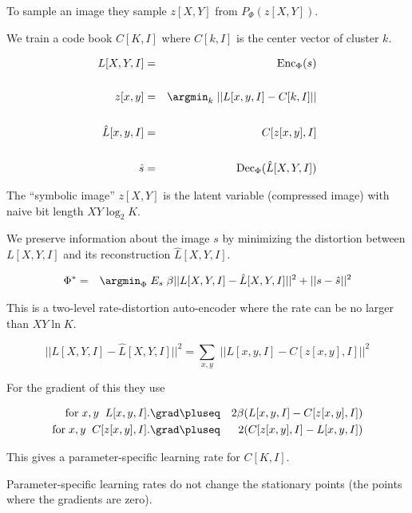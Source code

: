 {\vfill
To sample an image they sample $z[X,Y]$ from $P_\Phi(z[X,Y])$.



We train a code book $C[K,I]$ where $C[k,I]$ is the center vector of cluster $k$.

{\huge
\begin{eqnarray*}
L[X,Y,I] & = & \mathrm{Enc}_\Phi(s) \\
\\
z[x,y] & = & \argmin_k \;||L[x,y,I] - C[k,I]|| \\
\\
\hat{L}[x,y,I] & = & C[z[x,y],I] \\
\\
\hat{s} & = & \mathrm{Dec}_\Phi(\hat{L}[X,Y,I])
\end{eqnarray*}
}

\vfill
The ``symbolic image'' $z[X,Y]$ is the latent variable (compressed image) with naive bit length $XY\log_2 K$.


We preserve information about the image $s$ by minimizing the distortion between $L[X,Y,I]$ and its reconstruction $\hat{L}[X,Y,I]$.

\vfill
\begin{eqnarray*}
\Phi^* & = & \argmin_\Phi \;E_s\; \beta||L[X,Y,I] - \hat{L}[X,Y,I]||^2 + ||s -\hat{s}||^2
\end{eqnarray*}

\vfill
This is a two-level rate-distortion auto-encoder where the rate can be no larger than $XY\ln K$.


$$||L[X,Y,I] - \hat{L}[X,Y,I]||^2 = \sum_{x,y}\;||L[x,y,I] - C[z[x,y],I]||^2$$

\vfill
For the gradient of this they use

\begin{eqnarray*}
\mathrm{for}\;x,y\;\;L[x,y,I].\grad & \pluseq & 2\beta({L}[x,y,I]- C[z[x,y],I]) \\
\mathrm{for}\;x,y\;\;C[z[x,y],I].\grad & \pluseq & 2(C[z[x,y],I] - L[x,y,I])
\end{eqnarray*}

\vfill
This gives a parameter-specific learning rate for $C[K,I]$.

\vfill
Parameter-specific learning rates do not change the stationary points (the points where the gradients are zero).

}
